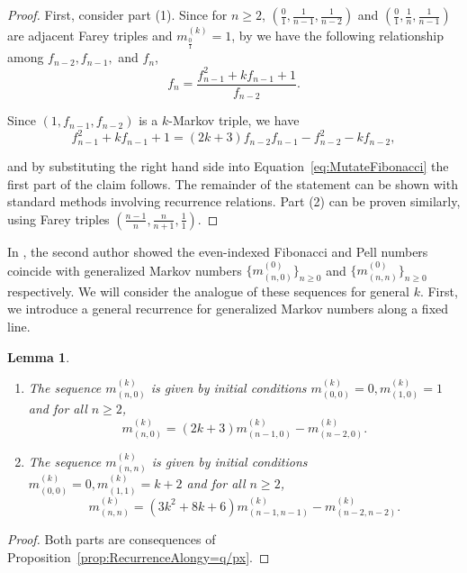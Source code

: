 \documentclass{article}
\newtheorem{lemma}[theorem]{Lemma}
\theoremstyle{remark}
\newcommand{\mk}{m^{(k)}}
\begin{document}
\begin{proof}
First, consider part (1). Since for $n \geq 2$, $(\frac{0}{1},\frac{1}{n-1},\frac{1}{n-2})$ and  $(\frac{0}{1},\frac{1}{n},\frac{1}{n-1})$ are adjacent Farey triples and $m_{\frac01}^{(k)} = 1$, by \cite[Theorem 1.1]{GyodaMatsushita} we have the following relationship among $f_{n-2},f_{n-1},$ and $f_n$, \begin{equation}
f_n = \frac{f_{n-1}^2 + kf_{n-1} + 1}{f_{n-2}}.\label{eq:MutateFibonacci}
\end{equation}

Since $(1,f_{n-1},f_{n-2})$ is a $k$-Markov triple, we have \[
f_{n-1}^2 + kf_{n-1} + 1 = (2k+3) f_{n-2}f_{n-1} - f_{n-2}^2 - kf_{n-2},
\]

and by substituting the right hand side into Equation~\ref{eq:MutateFibonacci} the first part of the claim follows. The remainder of the statement can be shown with standard methods involving recurrence relations. Part (2) can be proven similarly, using Farey triples $(\frac{n-1}{n},\frac{n}{n+1},\frac11)$. 

\end{proof}


In \cite{HuangMonotonicity}, the second author showed the even-indexed Fibonacci and Pell numbers coincide with generalized Markov numbers $\{m^{(0)}_{(n,0)}\}_{n \geq 0}$ and $\{m^{(0)}_{(n,n)}\}_{n \geq 0}$ respectively. We will consider the analogue of these sequences for general $k$.  First, we introduce a general recurrence for generalized Markov numbers along a fixed line.



\begin{lemma}\label{lem:Slope0and1}
\begin{enumerate}[label = (\arabic*)]
    \item The sequence $m^{(k)}_{(n,0)}$ is given by initial conditions $m^{(k)}_{(0,0)} = 0, m^{(k)}_{(1,0)} = 1$ and for all $n \geq 2$, \[
m^{(k)}_{(n,0)} = (2k+3) m^{(k)}_{(n-1,0)} - \mk_{(n-2,0)}.
\]
\item The sequence $m^{(k)}_{(n,n)}$ is given by initial conditions $m^{(k)}_{(0,0)} = 0, m^{(k)}_{(1,1)} = k+2$ and for all $n \geq 2$, \[
m^{(k)}_{(n,n)} = (3k^2 + 8k + 6) m^{(k)}_{(n-1,n-1)} - \mk_{(n-2,n-2)}.
\]
\end{enumerate}
\end{lemma}

\begin{proof}
Both parts are consequences of  Proposition~\ref{prop:RecurrenceAlongy=q/px}. 
\end{proof}
\end{document}
